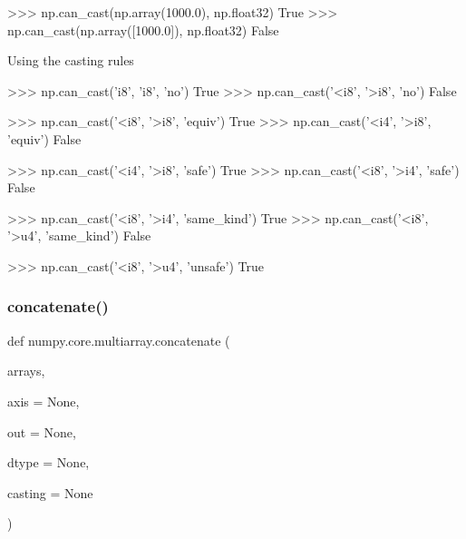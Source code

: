 \begin{DoxyVerb}
>>> np.can_cast(np.array(1000.0), np.float32)
True
>>> np.can_cast(np.array([1000.0]), np.float32)
False

Using the casting rules

>>> np.can_cast('i8', 'i8', 'no')
True
>>> np.can_cast('<i8', '>i8', 'no')
False

>>> np.can_cast('<i8', '>i8', 'equiv')
True
>>> np.can_cast('<i4', '>i8', 'equiv')
False

>>> np.can_cast('<i4', '>i8', 'safe')
True
>>> np.can_cast('<i8', '>i4', 'safe')
False

>>> np.can_cast('<i8', '>i4', 'same_kind')
True
>>> np.can_cast('<i8', '>u4', 'same_kind')
False

>>> np.can_cast('<i8', '>u4', 'unsafe')
True\end{DoxyVerb}
 \mbox{\label{namespacenumpy_1_1core_1_1multiarray_a34b85e05b7f083d1f8ffbb5c3ee700cf}} 
\subsubsection{\texorpdfstring{concatenate()}{concatenate()}}
{\footnotesize\ttfamily def numpy.\+core.\+multiarray.\+concatenate (\begin{DoxyParamCaption}\item[{}]{arrays,  }\item[{}]{axis = {\ttfamily None},  }\item[{}]{out = {\ttfamily None},  }\item[{}]{dtype = {\ttfamily None},  }\item[{}]{casting = {\ttfamily None} }\end{DoxyParamCaption})}

